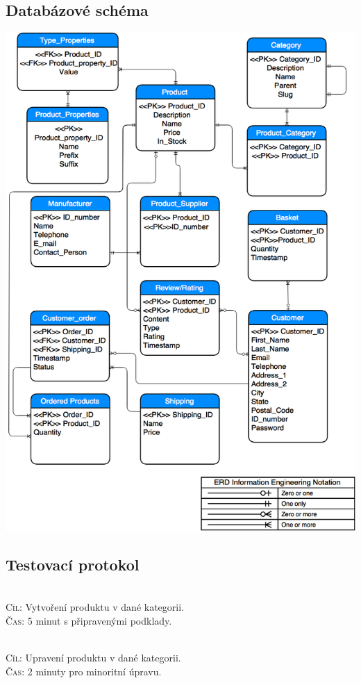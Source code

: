 \documentclass[11pt,a4paper]{article}
\begin{document}
\subsection*{Databázové schéma}
\centerline{\includegraphics[scale=0.55]{eshop_erd.png}}
\newpage

\subsection*{Testovací protokol}
\\
\textsc{Cíl}: Vytvoření produktu v dané kategorii.\\
\textsc{Čas}: 5 minut s připravenými podklady.\\
\bigskip

\\
\textsc{Cíl}: Upravení produktu v dané kategorii.\\
\textsc{Čas}: 2 minuty pro minoritní úpravu.\\
\bigskip
\end{document}
